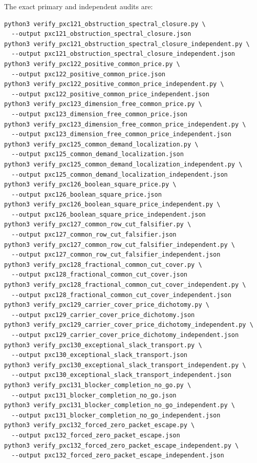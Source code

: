 \documentclass[11pt]{article}
\begin{document}
The exact primary and independent audits are:
\begin{verbatim}
python3 verify_pxc121_obstruction_spectral_closure.py \
  --output pxc121_obstruction_spectral_closure.json
python3 verify_pxc121_obstruction_spectral_closure_independent.py \
  --output pxc121_obstruction_spectral_closure_independent.json
python3 verify_pxc122_positive_common_price.py \
  --output pxc122_positive_common_price.json
python3 verify_pxc122_positive_common_price_independent.py \
  --output pxc122_positive_common_price_independent.json
python3 verify_pxc123_dimension_free_common_price.py \
  --output pxc123_dimension_free_common_price.json
python3 verify_pxc123_dimension_free_common_price_independent.py \
  --output pxc123_dimension_free_common_price_independent.json
python3 verify_pxc125_common_demand_localization.py \
  --output pxc125_common_demand_localization.json
python3 verify_pxc125_common_demand_localization_independent.py \
  --output pxc125_common_demand_localization_independent.json
python3 verify_pxc126_boolean_square_price.py \
  --output pxc126_boolean_square_price.json
python3 verify_pxc126_boolean_square_price_independent.py \
  --output pxc126_boolean_square_price_independent.json
python3 verify_pxc127_common_row_cut_falsifier.py \
  --output pxc127_common_row_cut_falsifier.json
python3 verify_pxc127_common_row_cut_falsifier_independent.py \
  --output pxc127_common_row_cut_falsifier_independent.json
python3 verify_pxc128_fractional_common_cut_cover.py \
  --output pxc128_fractional_common_cut_cover.json
python3 verify_pxc128_fractional_common_cut_cover_independent.py \
  --output pxc128_fractional_common_cut_cover_independent.json
python3 verify_pxc129_carrier_cover_price_dichotomy.py \
  --output pxc129_carrier_cover_price_dichotomy.json
python3 verify_pxc129_carrier_cover_price_dichotomy_independent.py \
  --output pxc129_carrier_cover_price_dichotomy_independent.json
python3 verify_pxc130_exceptional_slack_transport.py \
  --output pxc130_exceptional_slack_transport.json
python3 verify_pxc130_exceptional_slack_transport_independent.py \
  --output pxc130_exceptional_slack_transport_independent.json
python3 verify_pxc131_blocker_completion_no_go.py \
  --output pxc131_blocker_completion_no_go.json
python3 verify_pxc131_blocker_completion_no_go_independent.py \
  --output pxc131_blocker_completion_no_go_independent.json
python3 verify_pxc132_forced_zero_packet_escape.py \
  --output pxc132_forced_zero_packet_escape.json
python3 verify_pxc132_forced_zero_packet_escape_independent.py \
  --output pxc132_forced_zero_packet_escape_independent.json

\end{verbatim}
\end{document}
